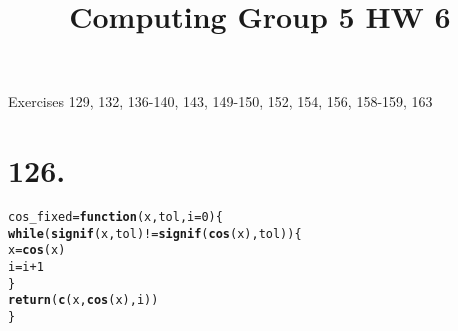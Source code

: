 \documentclass{article}\usepackage[]{graphicx}\usepackage[]{color}
\title{Computing Group 5 HW 6}
\makeatletter
\newcommand{\hlnum}[1]{\textcolor[rgb]{0.686,0.059,0.569}{#1}}%
\newcommand{\hlopt}[1]{\textcolor[rgb]{0,0,0}{#1}}%
\newcommand{\hlstd}[1]{\textcolor[rgb]{0.345,0.345,0.345}{#1}}%
\newcommand{\hlkwa}[1]{\textcolor[rgb]{0.161,0.373,0.58}{\textbf{#1}}}%
\newcommand{\hlkwb}[1]{\textcolor[rgb]{0.69,0.353,0.396}{#1}}%
\newcommand{\hlkwc}[1]{\textcolor[rgb]{0.333,0.667,0.333}{#1}}%
\newcommand{\hlkwd}[1]{\textcolor[rgb]{0.737,0.353,0.396}{\textbf{#1}}}%
\newenvironment{kframe}{%
 \def\at@end@of@kframe{}%
 \ifinner\ifhmode%
  \def\at@end@of@kframe{\end{minipage}}%
  \begin{minipage}{\columnwidth}%
 \fi\fi%
 \def\FrameCommand##1{\hskip\@totalleftmargin \hskip-\fboxsep
 \colorbox{shadecolor}{##1}\hskip-\fboxsep
     \hskip-\linewidth \hskip-\@totalleftmargin \hskip\columnwidth}%
 \MakeFramed {\advance\hsize-\width
   \@totalleftmargin\z@ \linewidth\hsize
   \@setminipage}}%
 {\par\unskip\endMakeFramed%
 \at@end@of@kframe}
\newenvironment{knitrout}{}{} %
\makeatother
\begin{document}
\maketitle

Exercises 129, 132, 136-140, 143, 149-150, 152, 154, 156, 158-159, 163

\section{126.}
\begin{knitrout}
\color{fgcolor}\begin{kframe}
\begin{alltt}
\hlstd{cos_fixed} \hlkwb{=} \hlkwa{function}\hlstd{(}\hlkwc{x}\hlstd{,} \hlkwc{tol}\hlstd{,} \hlkwc{i}\hlstd{=}\hlnum{0}\hlstd{)\{}
  \hlkwa{while}\hlstd{(}\hlkwd{signif}\hlstd{(x, tol)} \hlopt{!=} \hlkwd{signif}\hlstd{(}\hlkwd{cos}\hlstd{(x), tol))\{}
    \hlstd{x}\hlkwb{=}\hlkwd{cos}\hlstd{(x)}
    \hlstd{i}\hlkwb{=}\hlstd{i}\hlopt{+}\hlnum{1}
  \hlstd{\}}
  \hlkwd{return}\hlstd{(}\hlkwd{c}\hlstd{(x,} \hlkwd{cos}\hlstd{(x), i))}
\hlstd{\}}


\end{alltt}
\end{kframe}
\end{knitrout}
\end{document}
